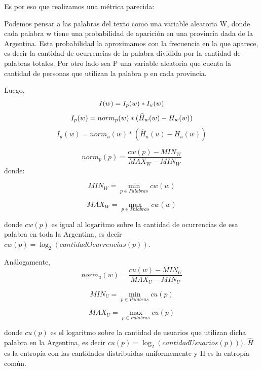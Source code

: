 Es por eso que realizamos una métrica parecida:

Podemos pensar a las palabras del texto como una variable aleatoria W, donde cada palabra w tiene una probabilidad de aparición en una provincia dada de la Argentina. Esta probabilidad la aproximamos con la frecuencia en la que aparece, es decir la cantidad de ocurrencias de la palabra dividida por la cantidad de palabras totales.
Por otro lado sea P una variable aleatoria que cuenta la cantidad de personas que 
utilizan la palabra p en cada provincia.

Luego,
\begin{equation}
I(w) =  I_p(w) * I_u(w)\\
\end{equation}
\begin{equation}
I_p(w) = norm_{p}(w) * (\widehat{H}_{w}(w) - H_{w}(w)) \\
\end{equation}
\begin{equation}
I_u(w) = norm_{u}(w) * (\widehat{H}_{u}(u) - H_{u}(w))
\end{equation}

\begin{equation}
norm_{p}(p) = \frac{cw(p)- MIN_W }{MAX_W - MIN_W}
\label{eq:norm1}
\end{equation}
donde:
\noindent\begin{minipage}{.5\linewidth}
\begin{equation}
  MIN_W = \min\limits_{p \in Palabras} cw(w)
\end{equation}
\end{minipage}%
\begin{minipage}{.5\linewidth}
\begin{equation}
  MAX_W = \max\limits_{p \in Palabras} cw(w)
\end{equation}
\end{minipage}
donde $cw(p)$ es igual al logaritmo sobre la cantidad de ocurrencias de esa palabra en toda la Argentina, es decir $cw(p) = \log_2(cantidadOcurrencias(p))$.

Análogamente,
\begin{equation}
norm_{u}(w) = \frac{cu(w)- MIN_U }{MAX_U - MIN_U}
\label{eq:norm2}
\end{equation}
\noindent\begin{minipage}{.5\linewidth}
\begin{equation}
  MIN_U = \min\limits_{p \in Palabras} cu(p)
\end{equation}
\end{minipage}%
\begin{minipage}{.5\linewidth}
\begin{equation}
  MAX_U = \max\limits_{p \in Palabras} cu(p)
\end{equation}
\end{minipage}
donde $cu(p)$ es el logaritmo sobre  la cantidad de usuarios que utilizan dicha palabra en la Argentina, es decir $cu(p)= \log_2(cantidadUsuarios(p)))$.
$\widehat{H}$ es la entropía con las cantidades distribuidas uniformemente y H es la entropía común.

